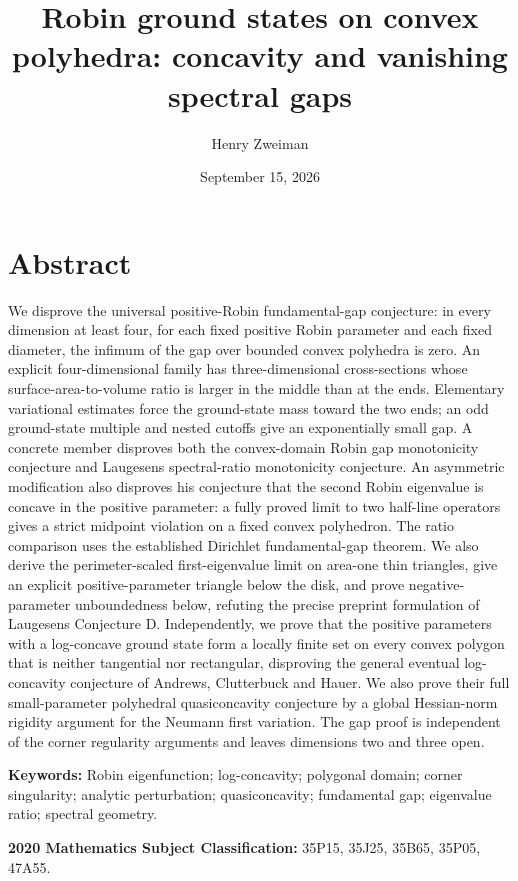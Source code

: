 \documentclass[11pt]{article}
\title{Robin ground states on convex polyhedra: concavity and vanishing spectral gaps}
\author{Henry Zweiman}
\date{September 15, 2026}
\begin{document}
\maketitle
\section{Abstract}\label{abstract}

We disprove the universal positive-Robin fundamental-gap conjecture: in
every dimension at least four, for each fixed positive Robin parameter
and each fixed diameter, the infimum of the gap over bounded convex
polyhedra is zero. An explicit four-dimensional family has
three-dimensional cross-sections whose surface-area-to-volume ratio is
larger in the middle than at the ends. Elementary variational estimates
force the ground-state mass toward the two ends; an odd ground-state
multiple and nested cutoffs give an exponentially small gap. A concrete
member disproves both the convex-domain Robin gap monotonicity
conjecture and Laugesen\textquotesingle s spectral-ratio monotonicity
conjecture. An asymmetric modification also disproves his conjecture
that the second Robin eigenvalue is concave in the positive parameter: a
fully proved limit to two half-line operators gives a strict midpoint
violation on a fixed convex polyhedron. The ratio comparison uses the
established Dirichlet fundamental-gap theorem. We also derive the
perimeter-scaled first-eigenvalue limit on area-one thin triangles, give
an explicit positive-parameter triangle below the disk, and prove
negative-parameter unboundedness below, refuting the precise preprint
formulation of Laugesen\textquotesingle s Conjecture D. Independently,
we prove that the positive parameters with a log-concave ground state
form a locally finite set on every convex polygon that is neither
tangential nor rectangular, disproving the general eventual
log-concavity conjecture of Andrews, Clutterbuck and Hauer. We also
prove their full small-parameter polyhedral quasiconcavity conjecture by
a global Hessian-norm rigidity argument for the Neumann first variation.
The gap proof is independent of the corner regularity arguments and
leaves dimensions two and three open.

\textbf{Keywords:} Robin eigenfunction; log-concavity; polygonal domain;
corner singularity; analytic perturbation; quasiconcavity; fundamental
gap; eigenvalue ratio; spectral geometry.

\textbf{2020 Mathematics Subject Classification:} 35P15, 35J25, 35B65,
35P05, 47A55.
\end{document}
